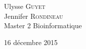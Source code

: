\begin{titlepage}
\begin{sffamily}
\begin{center}
 
      \begin{center} \large
       Ulysse \textsc{Guyet}\\
       Jennifer \textsc{Rondineau}\\
       Master 2 Bioinformatique \\
      \end{center}

    \vfill

    {\large 16 décembre 2015}

  \end{center}
  \end{sffamily}
\end{titlepage}
